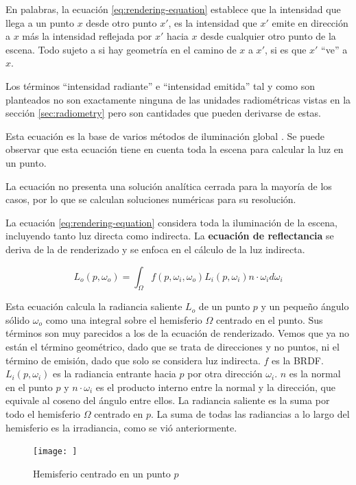 En palabras, la ecuación \ref{eq:rendering-equation} establece que la intensidad que llega a un punto $x$ desde otro punto $x'$, es la intensidad que $x'$ emite en dirección a $x$ más la intensidad reflejada por $x'$ hacia $x$ desde cualquier otro punto de la escena.
Todo sujeto a si hay geometría en el camino de $x$ a $x'$, si es que $x'$ ``ve'' a $x$.

Los términos ``intensidad radiante'' e ``intensidad emitida'' tal y como son planteados no son exactamente ninguna de las unidades radiométricas vistas en la sección \ref{sec:radiometry} pero son cantidades que pueden derivarse de estas.

Esta ecuación es la base de varios métodos de iluminación global \cite{rtr}.
Se puede observar que esta ecuación tiene en cuenta toda la escena para calcular la luz en un punto.

La ecuación no presenta una solución analítica cerrada para la mayoría de los casos, por lo que se calculan soluciones numéricas para su resolución.

La ecuación \ref{eq:rendering-equation} considera toda la iluminación de la escena, incluyendo tanto luz directa como indirecta.
La \textbf{ecuación de reflectancia} se deriva de la de renderizado y se enfoca en el cálculo de la luz indirecta.

\begin{equation}\label{eq:reflectance-equation}
    L_o(p, \omega_o) = \int_{\Omega}{f(p, \omega_i, \omega_o) L_i(p, \omega_i) n \cdot \omega_i d\omega_i}
\end{equation}

Esta ecuación calcula la radiancia saliente $L_o$ de un punto $p$ y un pequeño ángulo sólido $\omega_o$ como una integral sobre el hemisferio $\Omega$ centrado en el punto.
Sus términos son muy parecidos a los de la ecuación de renderizado.
Vemos que ya no están el término geométrico, dado que se trata de direcciones y no puntos, ni el término de emisión, dado que solo se considera luz indirecta.
$f$ es la BRDF.
$L_i(p, \omega_i)$ es la radiancia entrante hacia $p$ por otra dirección $\omega_i$.
$n$ es la normal en el punto $p$ y $n \cdot \omega_i$ es el producto interno entre la normal y la dirección, que equivale al coseno del ángulo entre ellos.
La radiancia saliente es la suma por todo el hemisferio $\Omega$ centrado en $p$.
La suma de todas las radiancias a lo largo del hemisferio es la irradiancia, como se vió anteriormente.

\begin{figure}
    \centering
    \texttt{[image: ]}
    \caption{Hemisferio centrado en un punto $p$}
    \label{fig:hemisphere}
\end{figure}

